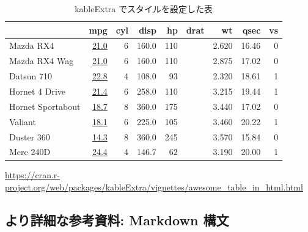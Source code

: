 \documentclass[
]{bxjsarticle}
\begin{document}
\begin{table}

\caption{\label{tab:table-example2}kableExtra でスタイルを設定した表}
\centering
\begin{tabular}[t]{l>{}rrrr>{}rrrr}
\toprule
  & mpg & cyl & disp & hp & drat & wt & qsec & vs\\
\midrule
Mazda RX4 & \href{https://haozhu233.github.io/kableExtra/}{\textcolor[HTML]{34B679}{21.0}} & 6 & 160.0 & 110 & \cellcolor[HTML]{43BF71}{\textcolor{white}{3.90}} & 2.620 & 16.46 & 0\\
Mazda RX4 Wag & \href{https://haozhu233.github.io/kableExtra/}{\textcolor[HTML]{34B679}{21.0}} & 6 & 160.0 & 110 & \cellcolor[HTML]{43BF71}{\textcolor{white}{3.90}} & 2.875 & 17.02 & 0\\
Datsun 710 & \href{https://haozhu233.github.io/kableExtra/}{\textcolor[HTML]{95D840}{22.8}} & 4 & 108.0 & 93 & \cellcolor[HTML]{37B878}{\textcolor{white}{3.85}} & 2.320 & 18.61 & 1\\
Hornet 4 Drive & \href{https://haozhu233.github.io/kableExtra/}{\textcolor[HTML]{44BF70}{21.4}} & 6 & 258.0 & 110 & \cellcolor[HTML]{414387}{\textcolor{white}{3.08}} & 3.215 & 19.44 & 1\\
Hornet Sportabout & \href{https://haozhu233.github.io/kableExtra/}{\textcolor[HTML]{26818E}{18.7}} & 8 & 360.0 & 175 & \cellcolor[HTML]{3C4F8A}{\textcolor{white}{3.15}} & 3.440 & 17.02 & 0\\
\addlinespace
Valiant & \href{https://haozhu233.github.io/kableExtra/}{\textcolor[HTML]{2C728E}{18.1}} & 6 & 225.0 & 105 & \cellcolor[HTML]{440154}{\textcolor{white}{2.76}} & 3.460 & 20.22 & 1\\
Duster 360 & \href{https://haozhu233.github.io/kableExtra/}{\textcolor[HTML]{440154}{14.3}} & 8 & 360.0 & 245 & \cellcolor[HTML]{375A8C}{\textcolor{white}{3.21}} & 3.570 & 15.84 & 0\\
Merc 240D & \href{https://haozhu233.github.io/kableExtra/}{\textcolor[HTML]{FDE725}{24.4}} & 4 & 146.7 & 62 & \cellcolor[HTML]{1FA187}{\textcolor{white}{3.69}} & 3.190 & 20.00 & 1\\
\bottomrule
\end{tabular}
\end{table}

\url{https://cran.r-project.org/web/packages/kableExtra/vignettes/awesome_table_in_html.html}

\hypertarget{ux3088ux308aux8a73ux7d30ux306aux53c2ux8003ux8cc7ux6599-markdown-ux69cbux6587}{%
\subsection{より詳細な参考資料: Markdown 構文}\label{ux3088ux308aux8a73ux7d30ux306aux53c2ux8003ux8cc7ux6599-markdown-ux69cbux6587}}
\end{document}
